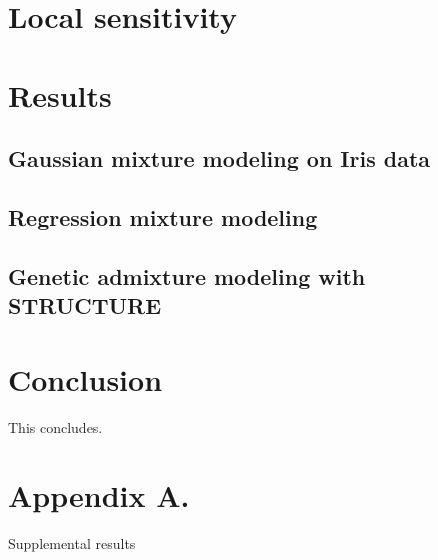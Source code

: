 \documentclass[twoside,11pt]{article}
\begin{document}
\section{Local sensitivity}


\section{Results}

\subsection{Gaussian mixture modeling on Iris data}


\subsection{Regression mixture modeling}


\subsection{Genetic admixture modeling with STRUCTURE}


\section{Conclusion}
This concludes.




\newpage

\appendix
\section*{Appendix A.}
\label{app:theorem}

Supplemental results

\vskip 0.2in

\end{document}

